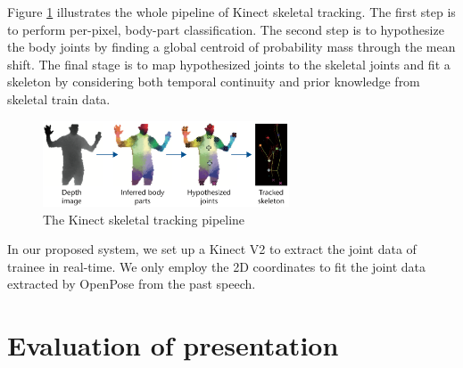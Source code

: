 \par Figure \ref{fig:trackingpipeline} illustrates the whole pipeline of Kinect skeletal tracking. The first step is to perform per-pixel, body-part classification. The second step is to hypothesize the body joints by finding a global centroid of probability mass through the mean shift. The final stage is to map hypothesized joints to the skeletal joints and fit a skeleton by considering both temporal continuity and prior knowledge from skeletal train data.

\begin{figure}[htbp]
  \centering\includegraphics[width=0.65\textwidth]{./img/skeletaltracking.png}
  \caption[The Kinect skeletal tracking pipeline]{The Kinect skeletal tracking pipeline \cite{Zhang2012}}\label{fig:trackingpipeline}
\end{figure}

\par In our proposed system, we set up a Kinect V2 to extract the joint data of trainee in real-time. We only employ the 2D coordinates to fit the joint data extracted by OpenPose from the past speech.

\section{Evaluation of presentation}

